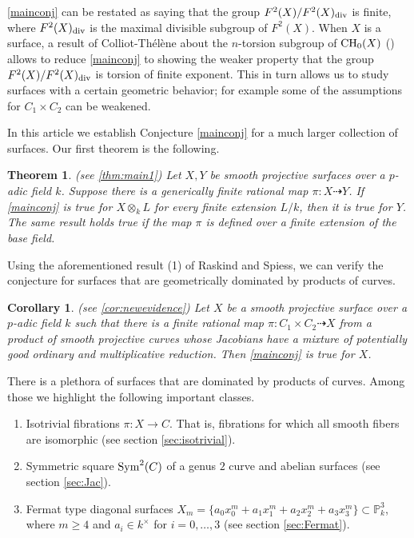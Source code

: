 \documentclass[12pt]{amsart}
\newtheorem{theo}[theo]{Theorem}
\newtheorem{cor}[cor]{Corollary}
\theoremstyle{remark}
\renewcommand{\1}{{\mathbb{S}}}
\newcommand{\CH}{{\rm CH}}
\newcommand{\<}{\langle}
\renewcommand{\>}{\rangle}
\newcommand{\Sym}{{\operatorname{\rm Sym}}}
\newcommand{\dv}{{\rm div}}
\begin{document}
\autoref{mainconj} can be restated as saying that the group $F^2(X)/F^2(X)_{\dv}$ is finite, where $F^2(X)_{\dv}$ is the maximal divisible subgroup of $F^2(X)$.
When $X$ is a surface, a result of Colliot-Th\'{e}l\`{e}ne about the $n$-torsion subgroup of $\CH_0(X)$ (\cite[Theorem 8.1]{CT1}) allows to reduce \autoref{mainconj} to showing the weaker property that the group $F^2(X)/F^2(X)_{\dv}$ is torsion of finite exponent. This in turn allows us to study surfaces with a certain geometric behavior; for example some of the assumptions for $C_1\times C_2$ can be weakened. 

  In this article we establish Conjecture \ref{mainconj} for a much larger collection of surfaces. Our first theorem is the following. 
 
 \begin{theo}\label{thm:main1intro} (see \autoref{thm:main1}) Let $X, Y$ be smooth projective surfaces over a $p$-adic field $k$. Suppose there is a generically finite rational map $\pi:X\dasharrow Y$. If \autoref{mainconj} is true for $X\otimes_k L$ for every finite extension $L/k$, then it is true for $Y$. The same result holds true if the map $\pi$ is defined over a finite extension of the base field. 
 \end{theo}

 Using the aforementioned result (1) of Raskind and Spiess, we can verify the conjecture for surfaces that are geometrically dominated by products of curves. 

 \begin{cor}\label{cor:newevidenceintro} (see \autoref{cor:newevidence})
     Let $X$ be a smooth projective surface over a $p$-adic field $k$ such that there is a finite rational map $\pi: C_1\times C_2\dashrightarrow X$ from a product of smooth projective curves whose Jacobians have a mixture of potentially good ordinary and multiplicative reduction. Then \autoref{mainconj} is true for $X$. 
 \end{cor}
 

There is a plethora of surfaces that are dominated by products of curves. Among those we highlight the following important classes. 
\begin{enumerate}
    \item[(a)]  Isotrivial fibrations $\pi:X\to C$. That is, fibrations for which all smooth fibers are isomorphic (see section \ref{sec:isotrivial}). 
    \item[(b)] Symmetric square $\Sym^2(C)$ of a genus $2$ curve and abelian surfaces (see section \ref{sec:Jac}).  
    \item[(c)] Fermat type diagonal surfaces $X_m=
    \{a_0x_0^m+a_1x_1^m+a_2x_2^m+a_3x_3^m\}\subset \mathbb{P}_k^3$, where $m\geq 4$ and $a_i\in k^{\times}$ for $i=0,\ldots, 3$ (see section \ref{sec:Fermat}).  
\end{enumerate}
\end{document}
